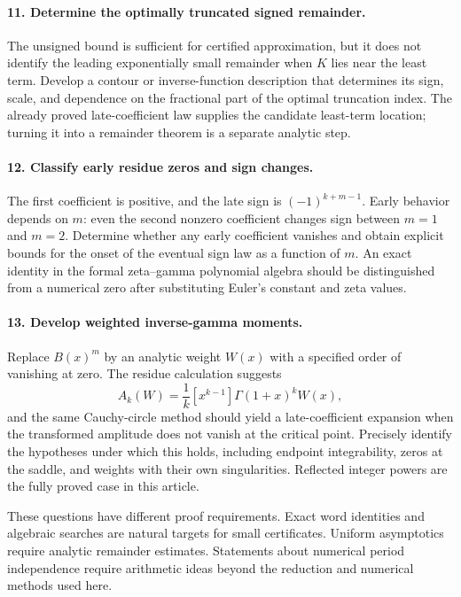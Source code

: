 \paragraph{11. Determine the optimally truncated signed remainder.}
The unsigned bound is sufficient for certified approximation, but it
does not identify the leading exponentially small remainder when
$K$ lies near the least term. Develop a contour or inverse-function
description that determines its sign, scale, and dependence on the
fractional part of the optimal truncation index. The already proved
late-coefficient law supplies the candidate least-term location;
turning it into a remainder theorem is a separate analytic step.

\paragraph{12. Classify early residue zeros and sign changes.}
The first coefficient is positive, and the late sign is
$(-1)^{k+m-1}$. Early behavior depends on $m$: even the second
nonzero coefficient changes sign between $m=1$ and $m=2$.
Determine whether any early coefficient vanishes and obtain explicit
bounds for the onset of the eventual sign law as a function of $m$.
An exact identity in the formal zeta--gamma polynomial algebra should
be distinguished from a numerical zero after substituting Euler's
constant and zeta values.

\paragraph{13. Develop weighted inverse-gamma moments.}
Replace $B(x)^m$ by an analytic weight $W(x)$ with a specified order
of vanishing at zero. The residue calculation suggests
\[
 A_k(W)=\frac1k[x^{k-1}]\Gamma(1+x)^kW(x),
\]
and the same Cauchy-circle method should yield a late-coefficient
expansion when the transformed amplitude does not vanish at the
critical point. Precisely identify the hypotheses under which this
holds, including endpoint integrability, zeros at the saddle, and
weights with their own singularities. Reflected integer powers are
the fully proved case in this article.

These questions have different proof requirements. Exact word
identities and algebraic searches are natural targets for small
certificates. Uniform asymptotics require analytic remainder estimates.
Statements about numerical period independence require arithmetic
ideas beyond the reduction and numerical methods used here.
